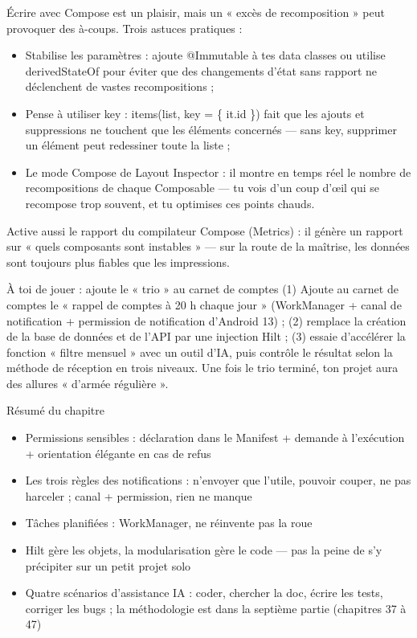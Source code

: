 
Écrire avec Compose est un plaisir, mais un « excès de recomposition » peut provoquer des à-coups. Trois astuces pratiques :

\begin{itemize}
  \item Stabilise les paramètres : ajoute @Immutable à tes data classes ou utilise derivedStateOf pour éviter que des changements d’état sans rapport ne déclenchent de vastes recompositions ;
  \item Pense à utiliser key : items(list, key = \{ it.id \}) fait que les ajouts et suppressions ne touchent que les éléments concernés — sans key, supprimer un élément peut redessiner toute la liste ;
  \item Le mode Compose de Layout Inspector : il montre en temps réel le nombre de recompositions de chaque Composable — tu vois d’un coup d’œil qui se recompose trop souvent, et tu optimises ces points chauds.
\end{itemize}

Active aussi le rapport du compilateur Compose (Metrics) : il génère un rapport sur « quels composants sont instables » — sur la route de la maîtrise, les données sont toujours plus fiables que les impressions.

\begin{tcbpractice}{À toi de jouer : ajoute le « trio » au carnet de comptes}
(1) Ajoute au carnet de comptes le « rappel de comptes à 20 h chaque jour » (WorkManager + canal de notification + permission de notification d’Android 13) ; (2) remplace la création de la base de données et de l’API par une injection Hilt ; (3) essaie d’accélérer la fonction « filtre mensuel » avec un outil d’IA, puis contrôle le résultat selon la méthode de réception en trois niveaux. Une fois le trio terminé, ton projet aura des allures « d’armée régulière ».

\end{tcbpractice}

\begin{tcbsummary}{Résumé du chapitre}
\begin{itemize}
  \item Permissions sensibles : déclaration dans le Manifest + demande à l’exécution + orientation élégante en cas de refus
  \item Les trois règles des notifications : n’envoyer que l’utile, pouvoir couper, ne pas harceler ; canal + permission, rien ne manque
  \item Tâches planifiées : WorkManager, ne réinvente pas la roue
  \item Hilt gère les objets, la modularisation gère le code — pas la peine de s’y précipiter sur un petit projet solo
  \item Quatre scénarios d’assistance IA : coder, chercher la doc, écrire les tests, corriger les bugs ; la méthodologie est dans la septième partie (chapitres 37 à 47)
\end{itemize}

\end{tcbsummary}
